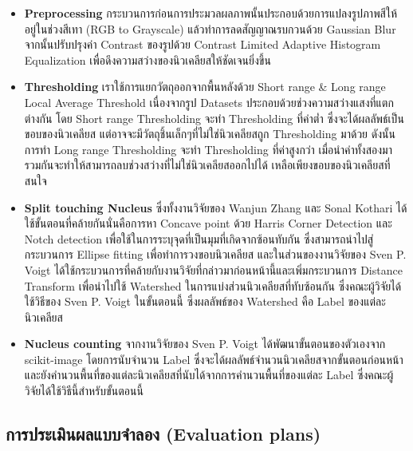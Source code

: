 \documentclass[12pt,oneside,openright,a4paper]{cpe-thai-project}
\begin{document}
\begin{itemize}[listparindent=\parindent]
\item \textbf{Preprocessing} 
กระบวนการก่อนการประมวลผลภาพนั้นประกอบด้วยการแปลงรูปภาพสีให้อยู่ในช่วงสีเทา (RGB to Grayscale) แล้วทำการลดสัญญาณรบกวนด้วย Gaussian Blur จากนั้นปรับปรุงค่า Contrast ของรูปด้วย Contrast Limited Adaptive Histogram Equalization เพื่อดึงความสว่างของนิวเคลียสให้ชัดเจนยิ่งขึ้น

\item \textbf{Thresholding} 
เราใช้การแยกวัตถุออกจากพื้นหลังด้วย Short range \& Long range Local Average Threshold \cite{28} เนื่องจากรูป Datasets ประกอบด้วยช่วงความสว่างแสงที่แตกต่างกัน โดย Short range Thresholding จะทำ Thresholding ที่ค่าต่ำ ซึ่งจะได้ผลลัพธ์เป็นขอบของนิวเคลียส แต่อาจจะมีวัตถุชิ้นเล็กๆที่ไม่ใช่นิวเคลียสถูก Thresholding มาด้วย ดังนั้นการทำ Long range Thresholding จะทำ Thresholding ที่ค่าสูงกว่า เมื่อนำค่าทั้งสองมารวมกันจะทำให้สามารถลบช่วงสว่างที่ไม่ใช่นิวเคลียสออกไปได้ เหลือเพียงขอบของนิวเคลียสที่สนใจ

\item \textbf{Split touching Nucleus} 
ซึ่งทั้งงานวิจัยของ Wanjun Zhang \cite{28} และ Sonal Kothari \cite{30} ได้ใช้ขั้นตอนที่คล้ายกันนั่นคือการหา Concave point \cite{28} ด้วย Harris Corner Detection และ Notch detection \cite{30} เพื่อใช้ในการระบุจุดที่เป็นมุมที่เกิดจากซ้อนทับกัน ซึ่งสามารถนำไปสู่กระบวนการ Ellipse fitting เพื่อทำการวงขอบนิวเคลียส และในส่วนของงานวิจัยของ Sven P. Voigt \cite{32} ได้ใช้กระบวนการที่คล้ายกับงานวิจัยที่กล่าวมาก่อนหน้านี้และเพิ่มกระบวนการ Distance Transform เพื่อนำไปใช้ Watershed ในการแบ่งส่วนนิวเคลียสที่ทับซ้อนกัน ซึ่งคณะผู้วิจัยได้ใช้วิธีของ Sven P. Voigt \cite{32} ในขั้นตอนนี้ ซึ่งผลลัพธ์ของ Watershed คือ Label ของแต่ละนิวเคลียส

\item \textbf{Nucleus counting} 
จากงานวิจัยของ Sven P. Voigt \cite{32} ได้พัฒนาขั้นตอนของตัวเองจาก scikit-image โดยการนับจำนวน Label ซึ่งจะได้ผลลัพธ์จำนวนนิวเคลียสจากขั้นตอนก่อนหน้าและยังคำนวนพื้นที่ของแต่ละนิวเคลียสที่นับได้จากการคำนวนพื้นที่ของแต่ละ Label ซึ่งคณะผู้วิจัยได้ใช้วิธีนี้สำหรับขั้นตอนนี้
\end{itemize}
\pagebreak
\subsection{การประเมินผลแบบจำลอง (Evaluation plans)}
\end{document}
